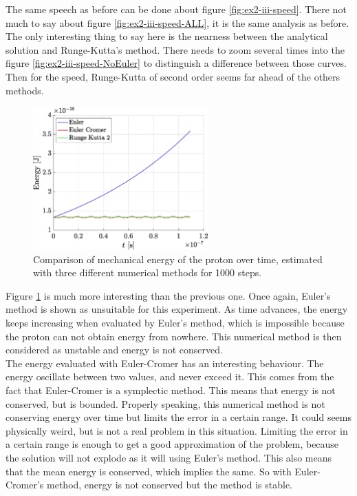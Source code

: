 \documentclass[a4paper,12pt,twoside]{article}
\begin{document}
The same speech as before can be done about figure \ref{fig:ex2-iii-speed}.
There not much to say about figure \ref{fig:ex2-iii-speed-ALL}, it is the same analysis as before.
The only interesting thing to say here is the nearness between the analytical solution and Runge-Kutta's method.
There needs to zoom several times into the figure \ref{fig:ex2-iii-speed-NoEuler} to distinguish a difference between those curves.
Then for the speed, Runge-Kutta of second order seems far ahead of the others methods.\\

\begin{figure}[h]
\centering
	\includegraphics[width=0.6\textwidth]{graphs/ex2_iii_ene.eps}
	\caption{Comparison of mechanical energy of the proton over time, estimated with three different numerical methods for \num{1000} steps.}
	\label{fig:ex2_iii_ene}
\end{figure}

Figure \ref{fig:ex2_iii_ene} is much more interesting than the previous one.
Once again, Euler's method is shown as unsuitable for this experiment.
As time advances, the energy keeps increasing when evaluated by Euler's method, which is impossible because the proton can not obtain energy from nowhere.
This numerical method is then considered as unstable and energy is not conserved.\\

The energy evaluated with Euler-Cromer has an interesting behaviour.
The energy oscillate between two values, and never exceed it.
This comes from the fact that Euler-Cromer is a symplectic method. %
This means that energy is not conserved, but is bounded.
Properly speaking, this numerical method is not conserving energy over time but limits the error in a certain range.
It could seems physically weird, but is not a real problem in this situation.
Limiting the error in a certain range is enough to get a good approximation of the problem, because the solution will not explode as it will using Euler's method.
This also means that the mean energy is conserved, which implies the same.
So with Euler-Cromer's method, energy is not conserved but the method is stable.\\
\end{document}
